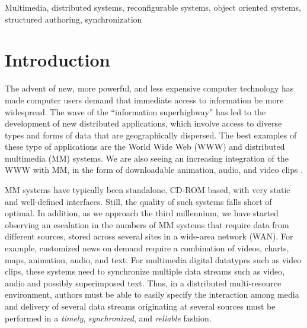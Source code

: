 \documentclass[twocolumn,10pt]{article}
\begin{document}
 {\small Multimedia, distributed systems,
reconfigurable systems, object oriented systems, structured authoring,
  synchronization}



%

\section{Introduction}

The advent of new, more powerful, and less expensive computer
technology has made computer users demand that immediate access to
information be more widespread.  The wave of the
``information superhighway'' has led to the development of new
distributed applications, which involve access to diverse types and
forms of data that are geographically dispersed.  The best examples of
these type of applications are the World Wide Web (WWW) and distributed
multimedia (MM) systems.  We are also seeing an increasing integration
of the WWW with MM, in the form of downloadable animation, audio, and
video clips \cite{smi:zeno}.

MM systems have typically been standalone, CD-ROM based, with very
static and well-defined interfaces.  Still, the quality of such
systems falls short of optimal.  In addition, as we approach the third
millennium, we have started observing an escalation in the numbers of
MM systems that require data from different sources, stored across
several sites in a wide-area network (WAN).  For example, customized
news on demand require a combination of videos, charts, maps,
animation, audio, and text.
For multimedia digital
datatypes such as video clips, these systems need to synchronize
multiple data streams such as video, audio and possibly superimposed
text.  Thus, in a distributed multi-resource environment, authors must
be able to easily specify the interaction among media and delivery of
several data streams %
originating at several sources must be performed in a {\em
timely}, {\em synchronized}, and {\em reliable} fashion.
\end{document}
